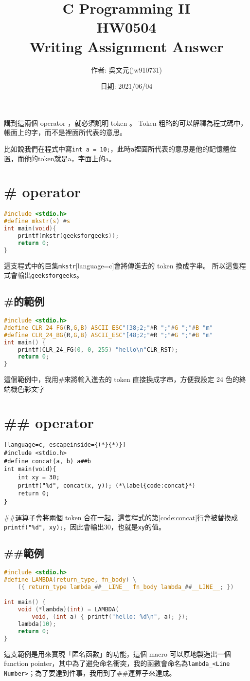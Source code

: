 \documentclass[a4paper,10pt]{article}
\title{C Programming II\\HW0504\\Writing Assignment Answer}
\author{作者: 吳文元(jw910731)}
\date{日期: 2021/06/04}
\begin{document}
\maketitle
講到這兩個 operator ，就必須說明 token 。 Token 粗略的可以解釋為程式碼中，帳面上的字，而不是裡面所代表的意思。

比如說我們在程式中寫\lstinline{int a = 10;}，此時\lstinline{a}裡面所代表的意思是他的記憶體位置，而他的token就是a，字面上的a。
\section{\# operator}
\begin{lstlisting}[language=c]
#include <stdio.h>
#define mkstr(s) #s
int main(void){       
    printf(mkstr(geeksforgeeks));
    return 0;
}
\end{lstlisting}
這支程式中的巨集\lstinline{mkstr}[language=c]會將傳進去的 token 換成字串。
所以這隻程式會輸出\lstinline{geeksforgeeks}。
\subsection{\#的範例}
\begin{lstlisting}[language=c, caption={\#範例程式}]
#include <stdio.h>
#define CLR_24_FG(R,G,B) ASCII_ESC"[38;2;"#R ";"#G ";"#B "m"
#define CLR_24_BG(R,G,B) ASCII_ESC"[48;2;"#R ";"#G ";"#B "m"
int main() {
    printf(CLR_24_FG(0, 0, 255) "hello\n"CLR_RST);
    return 0;
}
\end{lstlisting}
這個範例中，我用\#來將輸入進去的 token 直接換成字串，方便我設定 24 色的終端機色彩文字
\section{\#\# operator}
\begin{lstlisting}[language=c, escapeinside={(*}{*)}]
#include <stdio.h>
#define concat(a, b) a##b
int main(void){
    int xy = 30;
    printf("%d", concat(x, y)); (*\label{code:concat}*)
    return 0;
}
\end{lstlisting}
\#\#運算子會將兩個 token 合在一起，這隻程式的第\ref{code:concat}行會被替換成\lstinline{printf("%d", xy);}，因此會輸出30，也就是\lstinline{xy}的值。

\subsection{\#\#範例}
\begin{lstlisting}[language=c, caption={\#\#範例程式\protect\footnotemark}]
#include <stdio.h>
#define LAMBDA(return_type, fn_body) \
    ({ return_type lambda_##__LINE__ fn_body lambda_##__LINE__; })

int main() {
    void (*lambda)(int) = LAMBDA(
        void, (int a) { printf("hello: %d\n", a); });
    lambda(10);
    return 0;
}
\end{lstlisting}

這支範例是用來實現「匿名函數」的功能，這個 macro 可以原地製造出一個 function pointer，其中為了避免命名衝突，我的函數會命名為\lstinline{lambda_<Line Number>}；為了要達到件事，我用到了\#\#運算子來達成。
\end{document}
